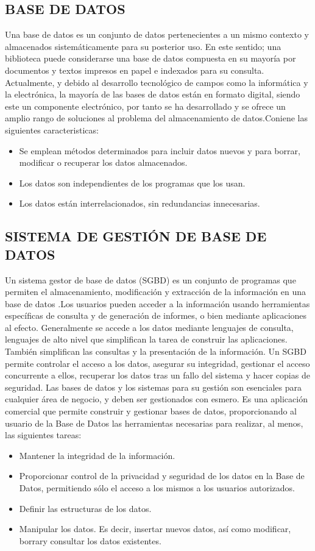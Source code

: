 \documentclass[%
 reprint,
 amsmath,amssymb,
 aps,
]{revtex4-1}
\begin{document}
\subsection{BASE DE DATOS}
\par Una base de datos es un conjunto de datos pertenecientes a un mismo contexto y almacenados sistemáticamente para su posterior uso. En este sentido; una biblioteca puede considerarse una base de datos compuesta en su mayoría por documentos y textos impresos en papel e indexados para su consulta. Actualmente, y debido al desarrollo tecnológico de campos como la informática y la electrónica, la mayoría de las bases de datos están en formato digital, siendo este un componente electrónico, por tanto se ha desarrollado y se ofrece un amplio rango de soluciones al problema del almacenamiento de datos.Coniene las siguientes caracteristicas:
\begin{itemize}
	\item Se emplean métodos determinados para incluir datos nuevos y para borrar, modificar o recuperar los datos almacenados.
	\item Los datos son independientes de los programas que los usan.
	\item Los datos están interrelacionados, sin redundancias innecesarias.
\end{itemize}
\subsection {SISTEMA DE GESTIÓN DE BASE DE DATOS}
Un sistema gestor de base de datos (SGBD) es un conjunto de programas que permiten el almacenamiento, modificación y extracción de la información en una base de datos .Los usuarios pueden acceder a la información usando herramientas específicas de consulta y de generación de informes, o bien mediante aplicaciones al efecto.
Generalmente se accede a los datos mediante lenguajes de consulta, lenguajes de alto nivel que simplifican la tarea de construir las aplicaciones. También simplifican las consultas y la presentación de la información. Un SGBD permite controlar el acceso a los datos, asegurar su integridad, gestionar el acceso concurrente a ellos, recuperar los datos tras un fallo del sistema y hacer copias de seguridad. Las bases de datos y los sistemas para su gestión son esenciales para cualquier área de negocio, y deben ser gestionados con esmero.
Es una aplicación comercial que permite construir y gestionar bases de datos, proporcionando al usuario de la Base de Datos las herramientas necesarias para realizar, al menos, las siguientes tareas:
\begin{itemize}
	\item Mantener la integridad de la información.
	\item Proporcionar control de la privacidad y seguridad de los datos en la Base de Datos, permitiendo sólo el acceso a los mismos a los usuarios autorizados.
	\item Definir las estructuras de los datos.
	\item Manipular los datos. Es decir, insertar nuevos datos, así como modificar, borrary consultar los datos existentes.
\end{itemize}
\end{document}
